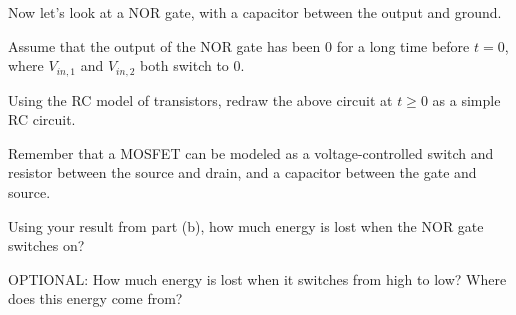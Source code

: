 Now let's look at a NOR gate, with a capacitor between the output and ground.




Assume that the output of the NOR gate has been $0$ for a long time before $t=0$, where $V_{in, 1}$ and $V_{in, 2}$ both switch to $0$.

\begin{enumerate}[resume]
\qitem Using the RC model of transistors, redraw the above circuit at $t\geq 0$ as a simple RC circuit.

Remember that a MOSFET can be modeled as a voltage-controlled switch and resistor between the source and drain, and a capacitor between the gate and source.


\qitem Using your result from part (b), how much energy is lost when the NOR gate switches on?

\sol{
    

\[\Delta E_R = -\frac{1}{2}C_\ell V_{DD}^2\]
}

\qitem OPTIONAL: How much energy is lost when it switches from high to low? Where does this energy come from?



\end{enumerate}
